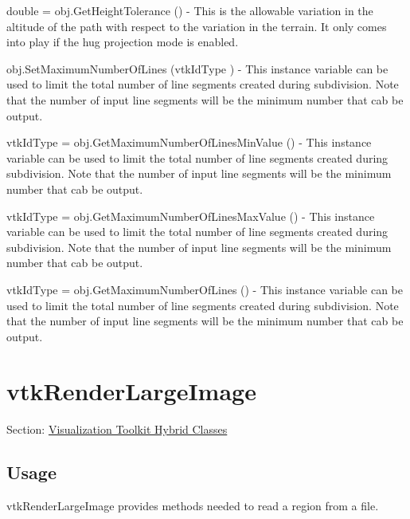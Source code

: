 \begin{DoxyItemize}
\item {\ttfamily double = obj.\-Get\-Height\-Tolerance ()} -\/ This is the allowable variation in the altitude of the path with respect to the variation in the terrain. It only comes into play if the hug projection mode is enabled.  
\item {\ttfamily obj.\-Set\-Maximum\-Number\-Of\-Lines (vtk\-Id\-Type )} -\/ This instance variable can be used to limit the total number of line segments created during subdivision. Note that the number of input line segments will be the minimum number that cab be output.  
\item {\ttfamily vtk\-Id\-Type = obj.\-Get\-Maximum\-Number\-Of\-Lines\-Min\-Value ()} -\/ This instance variable can be used to limit the total number of line segments created during subdivision. Note that the number of input line segments will be the minimum number that cab be output.  
\item {\ttfamily vtk\-Id\-Type = obj.\-Get\-Maximum\-Number\-Of\-Lines\-Max\-Value ()} -\/ This instance variable can be used to limit the total number of line segments created during subdivision. Note that the number of input line segments will be the minimum number that cab be output.  
\item {\ttfamily vtk\-Id\-Type = obj.\-Get\-Maximum\-Number\-Of\-Lines ()} -\/ This instance variable can be used to limit the total number of line segments created during subdivision. Note that the number of input line segments will be the minimum number that cab be output.  
\end{DoxyItemize}\hypertarget{vtkhybrid_vtkrenderlargeimage}{}\section{vtk\-Render\-Large\-Image}\label{vtkhybrid_vtkrenderlargeimage}
Section\-: \hyperlink{sec_vtkhybrid}{Visualization Toolkit Hybrid Classes} \hypertarget{vtkwidgets_vtkxyplotwidget_Usage}{}\subsection{Usage}\label{vtkwidgets_vtkxyplotwidget_Usage}
vtk\-Render\-Large\-Image provides methods needed to read a region from a file.

